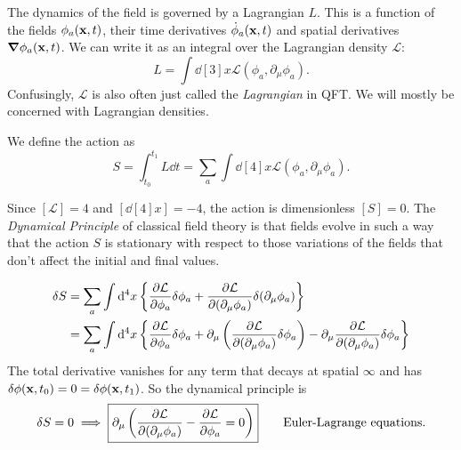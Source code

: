 The dynamics of the field is governed by a Lagrangian $L$. This is a function of the fields $\phi_a(\vb x, t)$, their time derivatives $\dot \phi_a(\vb x, t)$ and spatial derivatives $\grad \phi_a(\vb x, t)$.
We can write it as an integral over the Lagrangian density $\mathcal{L}$:
\begin{equation}
  L = \int \dd[3]{x} \mathcal{L}(\phi_a, \partial_\mu \phi_a).
\end{equation}
Confusingly, $\mathcal{L}$ is also often just called the \emph{Lagrangian} in QFT. We will mostly be concerned with Lagrangian densities.

We define the action as 
\begin{equation}
  S = \int_{t_0}^{t_1} L \dd{t} = \sum_{a} \int \dd[4]{x} \mathcal{L}(\phi_a, \partial_\mu \phi_a).
\end{equation}

Since $[\mathcal{L}] = 4$ and $[\dd[4]{x}] = -4$, the action is dimensionless $[S] = 0$.
The \emph{Dynamical Principle} of classical field theory is that fields evolve in such a way that the action $S$ is stationary with respect to those variations of the fields that don't affect the initial and final values.

\begin{align}
  \label{eq:variation in S}
  \delta S &= \sum_a \int \dd[4]{x} \left\{ \pdv{\mathcal{L}}{\phi_a} \delta \phi_a + \pdv{\mathcal{L}}{(\partial_\mu \phi_a)} \delta(\partial_\mu \phi_a) \right\} \\
  &= \sum_a \int \dd[4]{x} \left\{ \pdv{\mathcal{L}}{\phi_a} \delta \phi_a + \partial_\mu \left( \pdv{\mathcal{L}}{(\partial_\mu \phi_a)} \delta \phi_a \right) - \partial_\mu \pdv{\mathcal{L}}{(\partial_\mu \phi_a)} \delta \phi_a \right\}
\end{align}
The total derivative vanishes for any term that decays at spatial $\infty$ and has $\delta \phi(\vb x, t_0) = 0 = \delta \phi(\vb x, t_1)$. So the dynamical principle is
\begin{equation}
  \label{eq:EL}
  \delta S = 0 \implies \boxed{\partial_\mu \left( \pdv{\mathcal{L}}{(\partial_\mu \phi_a)} - \pdv{\mathcal{L}}{\phi_a} = 0 \right)} \qquad \text{Euler-Lagrange equations}.
\end{equation}

